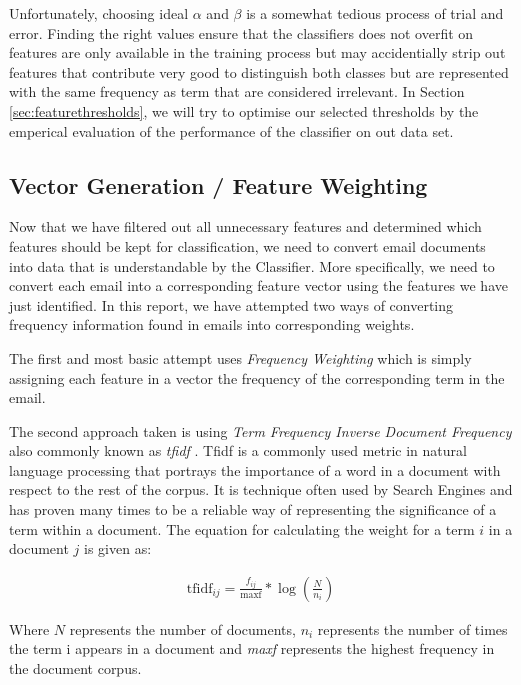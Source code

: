 Unfortunately, choosing ideal \(\alpha \) and \(\beta\) is a somewhat tedious process of trial and error.
Finding the right values ensure that the classifiers does not overfit on features are only available in the training process but may accidentially strip out features that contribute very good to distinguish both classes but are represented with the same frequency as term that are considered irrelevant.
In Section \ref{sec:featurethresholds}, we will try to optimise our selected thresholds by the emperical evaluation of the performance of the classifier on out data set.

\subsection{Vector Generation / Feature Weighting}

Now that we have filtered out all unnecessary features and determined which features should be kept for classification, we need to convert email documents into data that is understandable by the Classifier. More specifically, we need to convert each email into a corresponding feature vector using the features we have just identified. In this report, we have attempted two ways of converting frequency information found in emails into corresponding weights. 

The first and most basic attempt uses \emph{Frequency Weighting} which is simply assigning each feature in a vector the frequency of the corresponding term in the email. 

The second approach taken is using \emph{Term Frequency Inverse Document Frequency} also commonly known as \emph{tfidf} \cite{tfidf1973}. Tfidf is a commonly used metric in natural language processing that portrays the importance of a word in a document with respect to the rest of the corpus. It is technique often used by Search Engines and has proven many times to be a reliable way of representing the significance of a term within a document. The equation for calculating the weight for a term $i$ in a document $j$ is given as:

\begin{align*}
	\textrm{tfidf}_{ij} = \frac{f_{ij}}{\textrm{maxf}} * \log\left(\frac{N}{n_i}\right)
\end{align*}

Where $N$ represents the number of documents, $n_i$ represents the number of times the term i appears in a document and \emph{maxf} represents the highest frequency in the document corpus.

